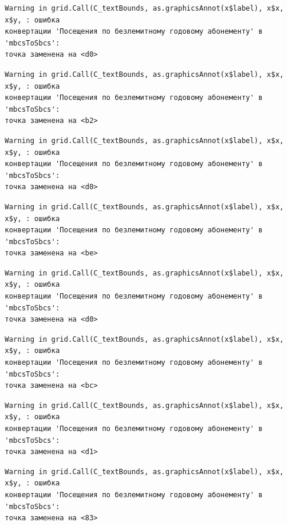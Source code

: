 \documentclass[
  letterpaper,
  DIV=11,
  numbers=noendperiod]{scrreprt}
\begin{document}
\begin{verbatim}
Warning in grid.Call(C_textBounds, as.graphicsAnnot(x$label), x$x, x$y, : ошибка
конвертации 'Посещения по безлемитному годовому абонементу' в 'mbcsToSbcs':
точка заменена на <d0>
\end{verbatim}

\begin{verbatim}
Warning in grid.Call(C_textBounds, as.graphicsAnnot(x$label), x$x, x$y, : ошибка
конвертации 'Посещения по безлемитному годовому абонементу' в 'mbcsToSbcs':
точка заменена на <b2>
\end{verbatim}

\begin{verbatim}
Warning in grid.Call(C_textBounds, as.graphicsAnnot(x$label), x$x, x$y, : ошибка
конвертации 'Посещения по безлемитному годовому абонементу' в 'mbcsToSbcs':
точка заменена на <d0>
\end{verbatim}

\begin{verbatim}
Warning in grid.Call(C_textBounds, as.graphicsAnnot(x$label), x$x, x$y, : ошибка
конвертации 'Посещения по безлемитному годовому абонементу' в 'mbcsToSbcs':
точка заменена на <be>
\end{verbatim}

\begin{verbatim}
Warning in grid.Call(C_textBounds, as.graphicsAnnot(x$label), x$x, x$y, : ошибка
конвертации 'Посещения по безлемитному годовому абонементу' в 'mbcsToSbcs':
точка заменена на <d0>
\end{verbatim}

\begin{verbatim}
Warning in grid.Call(C_textBounds, as.graphicsAnnot(x$label), x$x, x$y, : ошибка
конвертации 'Посещения по безлемитному годовому абонементу' в 'mbcsToSbcs':
точка заменена на <bc>
\end{verbatim}

\begin{verbatim}
Warning in grid.Call(C_textBounds, as.graphicsAnnot(x$label), x$x, x$y, : ошибка
конвертации 'Посещения по безлемитному годовому абонементу' в 'mbcsToSbcs':
точка заменена на <d1>
\end{verbatim}

\begin{verbatim}
Warning in grid.Call(C_textBounds, as.graphicsAnnot(x$label), x$x, x$y, : ошибка
конвертации 'Посещения по безлемитному годовому абонементу' в 'mbcsToSbcs':
точка заменена на <83>
\end{verbatim}
\end{document}
